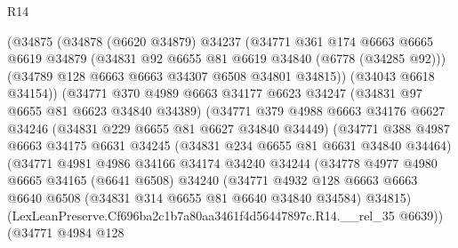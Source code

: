 \begin{lexlean}{R14}
\begin{coremodule}
                    (@34875
                      (@34878
                        (@6620 @34879)
                        @34237
                        (@34771
                          @361
                          @174
                          @6663
                          @6665
                          @6619
                          @34879
                          (@34831 @92 @6655 @81 @6619 @34840 (@6778 (@34285 @92)))
                          (@34789 @128 @6663 @6663 @34307 @6508 @34801 @34815))
                        (@34043 @6618 @34154))
                      (@34771
                        @370
                        @4989
                        @6663
                        @34177
                        @6623
                        @34247
                        (@34831 @97 @6655 @81 @6623 @34840 @34389)
                        (@34771
                          @379
                          @4988
                          @6663
                          @34176
                          @6627
                          @34246
                          (@34831 @229 @6655 @81 @6627 @34840 @34449)
                          (@34771
                            @388
                            @4987
                            @6663
                            @34175
                            @6631
                            @34245
                            (@34831 @234 @6655 @81 @6631 @34840 @34464)
                            (@34771
                              @4981
                              @4986
                              @34166
                              @34174
                              @34240
                              @34244
                              (@34778
                                @4977
                                @4980
                                @6665
                                @34165
                                (@6641 @6508)
                                @34240
                                (@34771
                                  @4932
                                  @128
                                  @6663
                                  @6663
                                  @6640
                                  @6508
                                  (@34831 @314 @6655 @81 @6640 @34840 @34584)
                                  @34815)
                                (LexLeanPreserve.Cf696ba2c1b7a80aa3461f4d56447897c.R14.__rel_35
                                  @6639))
                              (@34771
                                @4984
                                @128

\end{coremodule}
\end{lexlean}

